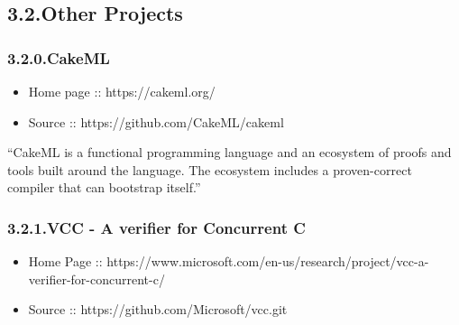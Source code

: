 \documentclass[12pt,twoside]{article}
\begin{document}
\subsection{3.2.\hspace*{0.5em}Other Projects}\label{sec-other-projects}%

\subsubsection{3.2.0.\hspace*{0.5em}CakeML}\label{sec-cakeml}%

\begin{itemize}[noitemsep,topsep=\mdcompacttopsep]%

\item{}Home page :: https://cakeml.org/%

\item{}Source :: https://github.com/CakeML/cakeml%
\end{itemize}%

\noindent{}\textquotedblleft{}CakeML is a functional programming language and an ecosystem of proofs
and tools built around the language. The ecosystem includes a
proven-correct compiler that can bootstrap itself.\textquotedblright{}%

\subsubsection{3.2.1.\hspace*{0.5em}VCC - A verifier for Concurrent C}\label{sec-vcc---a-verifier-for-concurrent-c}%

\begin{itemize}[noitemsep,topsep=\mdcompacttopsep]%

\item{}Home Page :: https://www.microsoft.com/en-us/research/project/vcc-a-verifier-for-concurrent-c/%

\item{}Source :: https://github.com/Microsoft/vcc.git%
\end{itemize}%
\end{document}
